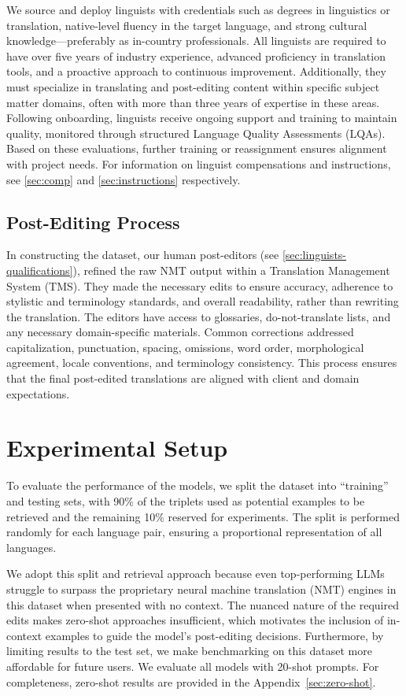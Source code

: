 \documentclass[11pt]{article}
\theoremstyle{plain}
\theoremstyle{definition}
\theoremstyle{remark}
\begin{document}
We source and deploy linguists with credentials such as degrees in linguistics or translation, native-level fluency in the target language, and strong cultural knowledge—preferably as in-country professionals. All linguists are required to have over five years of industry experience, advanced proficiency in translation tools, and a proactive approach to continuous improvement. Additionally, they must specialize in translating and post-editing content within specific subject matter domains, often with more than three years of expertise in these areas. Following onboarding, linguists receive ongoing support and training to maintain quality, monitored through structured Language Quality Assessments (LQAs). Based on these evaluations, further training or reassignment ensures alignment with project needs. For information on linguist compensations and instructions, see \ref{sec:comp} and \ref{sec:instructions} respectively.


\subsection{Post-Editing Process}
In constructing the dataset, our human post-editors (see \cref{sec:linguists-qualifications}), refined the raw NMT output within a Translation Management System (TMS). They made the necessary edits to ensure accuracy, adherence to stylistic and terminology standards, and overall readability, rather than rewriting the translation. The editors have access to glossaries, do-not-translate lists, and any necessary domain-specific materials. Common corrections addressed capitalization, punctuation, spacing, omissions, word order, morphological agreement, locale conventions, and terminology consistency. This process ensures that the final post-edited translations are aligned with client and domain expectations.


\section{Experimental Setup}
To evaluate the performance of the models, we split the dataset into ``training'' and testing sets, with 90\% of the triplets used as potential examples to be retrieved and the remaining 10\% reserved for experiments. The split is performed randomly for each language pair, ensuring a proportional representation of all languages.

We adopt this split and retrieval approach because even top-performing LLMs struggle to surpass the proprietary neural machine translation (NMT) engines in this dataset when presented with no context. The nuanced nature of the required edits makes zero-shot approaches insufficient, which motivates the inclusion of in-context examples to guide the model’s post-editing decisions. Furthermore, by limiting results to the test set, we make benchmarking on this dataset more affordable for future users. We evaluate all models with 20-shot prompts. For completeness, zero-shot results are provided in the Appendix~\ref{sec:zero-shot}.
\end{document}
